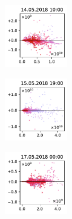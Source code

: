 \begin{figure}[H]
    \centering
    \begin{subfigure}
        \centering
        \includegraphics[width=0.30\textwidth,valign=t]{evaluation/figures/perturbations/perturbation-14.05.2018:10.00-temperature-add-0.04K.pdf}
    \end{subfigure}
    \begin{subfigure}
        \centering
        \includegraphics[width=0.30\textwidth,valign=t]{evaluation/figures/perturbations/perturbation-15.05.2018:19.00-temperature-add-0.04K.pdf}
    \end{subfigure}
    \begin{subfigure}
        \centering
        \includegraphics[width=0.30\textwidth,valign=t]{evaluation/figures/perturbations/perturbation-17.05.2018:00.00-temperature-add-0.04K.pdf}
    \end{subfigure}


\end{figure}
